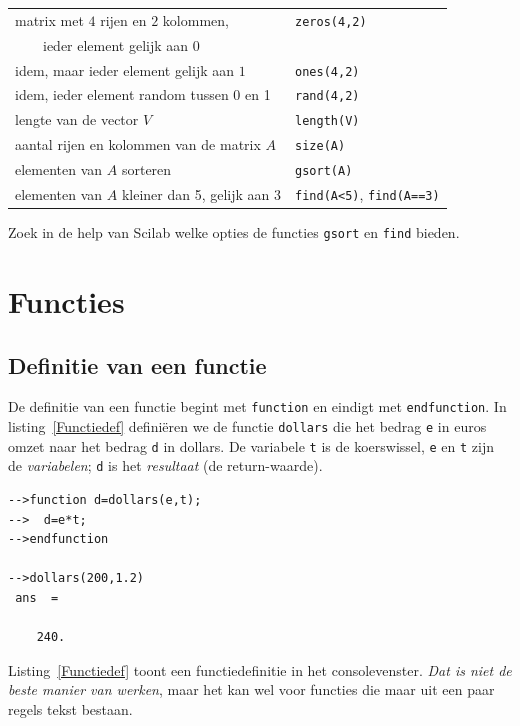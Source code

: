 \begin{table}[h]
\begin{tabular}{p{}p{}}
matrix met $4$ rijen en $2$ kolommen,               & \verb+zeros(4,2)+ \\
$\qquad$ieder element gelijk aan $0$ &\\

idem, maar ieder element gelijk aan $1$ & \verb+ones(4,2)+ \\

idem, ieder element random tussen 0 en 1 & \verb+rand(4,2)+ \\
lengte van de vector $V$ & \texttt{length(V)} \\
aantal rijen en kolommen van de matrix $A$ & \texttt{size(A)} \\
elementen van $A$ sorteren&\texttt{gsort(A)}\\
elementen van $A$ kleiner dan 5, gelijk aan 3& \verb+find(A<5)+, \verb+find(A==3)+\\
\bottomrule
\end{tabular}
\label{tabel:matrices}
\end{table}

Zoek in de help van Scilab welke opties de functies \verb/gsort/ en \verb/find/ bieden. 


\section{Functies}

\subsection{Definitie van een functie}
\label{sec:werken_met_functies}
De definitie van een functie begint met \verb+function+ en eindigt met \verb+endfunction+. In listing~\ref{Functiedef} definiëren we de functie \verb+dollars+ die het bedrag \verb+e+ in euros omzet naar het bedrag \verb+d+ in dollars. De variabele \verb/t/ is de koerswissel, \verb/e/ en \verb+t+ zijn de \emph{variabelen}; \verb/d/ is het \emph{resultaat} (de return-waarde).
\begin{lstlisting}[caption={Functie defini\"eren}, label=Functiedef]
-->function d=dollars(e,t);
-->  d=e*t;
-->endfunction
 
-->dollars(200,1.2)
 ans  =
 
    240.  
\end{lstlisting}

Listing~\ref{Functiedef} toont een functiedefinitie in het consolevenster. \emph{Dat is niet de beste manier van werken}, maar het kan wel
voor functies die maar uit een paar regels tekst bestaan.


